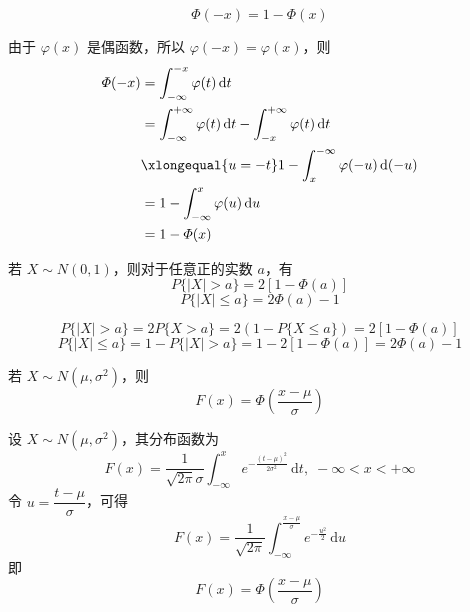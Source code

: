 \setcounter{propertyname}{0}

\begin{property}
    \begin{equation} \label{equation:Phi(-x)}
        \varPhi(-x) = 1-\varPhi(x)
    \end{equation}
\end{property}

\begin{myproof}
    由于 $\varphi(x)$ 是偶函数，所以 $\varphi(-x)=\varphi(x)$，则
    $$
    \begin{aligned}
        \varPhi(-x) &= \int_{-\infty}^{-x} \varphi(t) \,\text{d}t \\
        &= \int_{-\infty}^{+\infty} \varphi(t) \,\text{d}t - \int_{-x}^{+\infty} \varphi(t) \,\text{d}t \\
        & \xlongequal{u=-t} 1 - \int_{x}^{-\infty} \varphi(-u) \,\text{d}(-u) \\
        &= 1 - \int_{-\infty}^{x} \varphi(u) \,\text{d}u \\
        &= 1-\varPhi(x)
    \end{aligned}
    $$
\end{myproof}

\begin{property}
    若 $X \sim N(0,1)$，则对于任意正的实数 $a$，有
    \begin{equation} \label{equation:P(X>a)}
        P\{|X|>a\}=2[1-\varPhi(a)]
    \end{equation}
    \begin{equation} \label{equation:P(X<=a)}
        P\{|X| \leqslant a\} = 2\varPhi(a)-1
    \end{equation}
\end{property}

\begin{myproof}
    $$
    P\{|X|>a\} = 2 P\{X>a\} = 2(1-P\{X \leqslant a\}) = 2[1-\varPhi(a)]
    $$
    $$
    P\{|X| \leqslant a\} = 1-P\{|X|>a\} = 1-2[1-\varPhi(a)] = 2\varPhi(a)-1
    $$
\end{myproof}

\begin{property}[(正态分布的标准化)] \label{prop:standard}
    若 $X \sim N(\mu,\sigma^2)$，则
    \begin{equation} \label{equation:standard}
        F(x)=\varPhi(\dfrac{x-\mu}{\sigma})
    \end{equation}
\end{property}

\begin{myproof}
    设 $X \sim N(\mu,\sigma^2)$，其分布函数为
    $$
    F(x) = \dfrac{1}{\sqrt{2\pi}\sigma} \int_{-\infty}^x e^{-\frac{(t-\mu)^2}{2\sigma^2}}\,\text{d}t, \; -\infty < x < +\infty
    $$
    令 $u=\dfrac{t-\mu}{\sigma}$，可得
    $$
    F(x)=\dfrac{1}{\sqrt{2\pi}} \int_{-\infty}^{\frac{x-\mu}{\sigma}} e^{-\frac{u^2}{2}}\,\text{d}u
    $$
    即
    $$
        F(x)=\varPhi(\dfrac{x-\mu}{\sigma})
    $$
\end{myproof}

